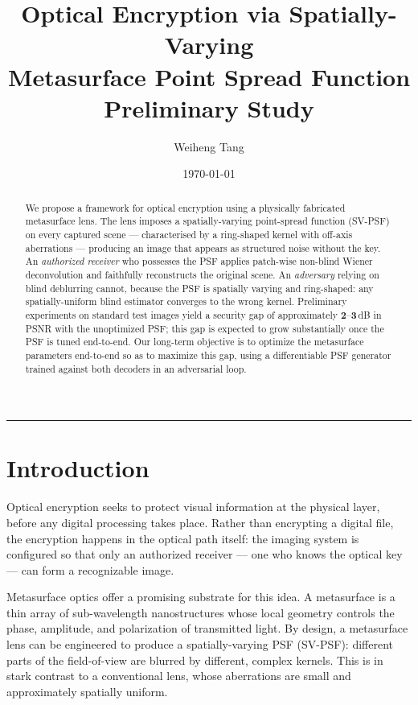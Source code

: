 \documentclass[11pt, a4paper]{article}
\title{%
  \textbf{Optical Encryption via Spatially-Varying\\[4pt]
          Metasurface Point Spread Function}\\[8pt]
  \large Preliminary Study
}
\author{Weiheng Tang}
\date{\today}
\begin{document}
\maketitle
\tableofcontents
\bigskip\hrule\bigskip

\begin{abstract}
We propose a framework for optical encryption using a physically fabricated
metasurface lens.  The lens imposes a spatially-varying point-spread function
(SV-PSF) on every captured scene — characterised by a ring-shaped kernel with
off-axis aberrations — producing an image that appears as structured noise
without the key.  An \emph{authorized receiver} who possesses the PSF applies
patch-wise non-blind Wiener deconvolution and faithfully reconstructs the
original scene.  An \emph{adversary} relying on blind deblurring cannot,
because the PSF is spatially varying and ring-shaped: any spatially-uniform
blind estimator converges to the wrong kernel.  Preliminary experiments on
standard test images yield a security gap of approximately $\mathbf{2}$--$\mathbf{3}$\,dB
in PSNR with the unoptimized PSF; this gap is expected to grow substantially
once the PSF is tuned end-to-end.  Our long-term
objective is to optimize the metasurface parameters end-to-end so as to
maximize this gap, using a differentiable PSF generator trained against both
decoders in an adversarial loop.
\end{abstract}

\section{Introduction}
\label{sec:intro}

Optical encryption seeks to protect visual information at the physical layer,
before any digital processing takes place.  Rather than encrypting a digital
file, the encryption happens in the optical path itself: the imaging system
is configured so that only an authorized receiver — one who knows the optical
key — can form a recognizable image.

Metasurface optics offer a promising substrate for this idea.  A metasurface
is a thin array of sub-wavelength nanostructures whose local geometry controls
the phase, amplitude, and polarization of transmitted light.  By design, a
metasurface lens can be engineered to produce a spatially-varying PSF (SV-PSF):
different parts of the field-of-view are blurred by different, complex kernels.
This is in stark contrast to a conventional lens, whose aberrations are small
and approximately spatially uniform.
\end{document}

